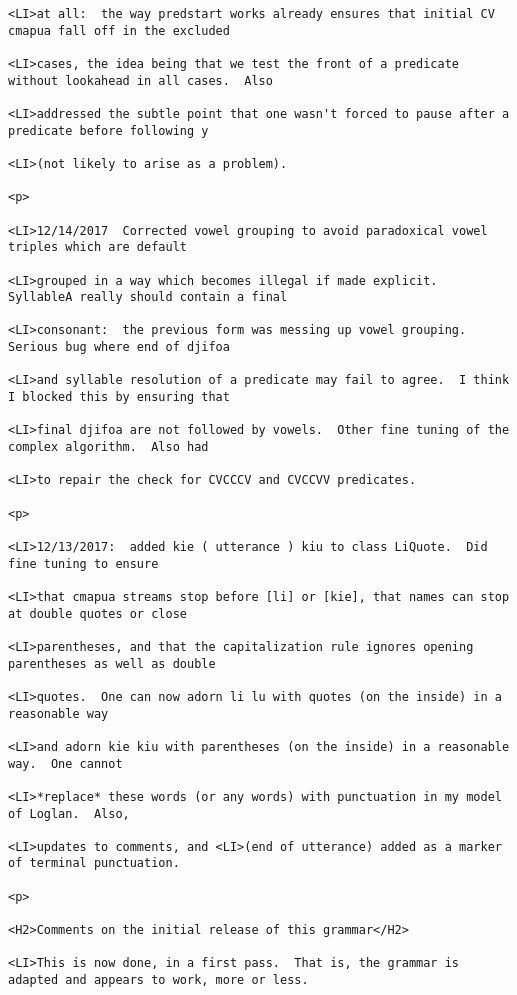 \documentclass[12pt]{article}
\begin{document}
\begin{lstlisting}
<LI>at all:  the way predstart works already ensures that initial CV cmapua fall off in the excluded

<LI>cases, the idea being that we test the front of a predicate without lookahead in all cases.  Also

<LI>addressed the subtle point that one wasn't forced to pause after a predicate before following y

<LI>(not likely to arise as a problem).

<p>

<LI>12/14/2017  Corrected vowel grouping to avoid paradoxical vowel triples which are default

<LI>grouped in a way which becomes illegal if made explicit.  SyllableA really should contain a final

<LI>consonant:  the previous form was messing up vowel grouping.  Serious bug where end of djifoa

<LI>and syllable resolution of a predicate may fail to agree.  I think I blocked this by ensuring that

<LI>final djifoa are not followed by vowels.  Other fine tuning of the complex algorithm.  Also had

<LI>to repair the check for CVCCCV and CVCCVV predicates.

<p>

<LI>12/13/2017:  added kie ( utterance ) kiu to class LiQuote.  Did fine tuning to ensure

<LI>that cmapua streams stop before [li] or [kie], that names can stop at double quotes or close

<LI>parentheses, and that the capitalization rule ignores opening parentheses as well as double

<LI>quotes.  One can now adorn li lu with quotes (on the inside) in a reasonable way

<LI>and adorn kie kiu with parentheses (on the inside) in a reasonable way.  One cannot

<LI>*replace* these words (or any words) with punctuation in my model of Loglan.  Also,

<LI>updates to comments, and <LI>(end of utterance) added as a marker of terminal punctuation.

<p>

<H2>Comments on the initial release of this grammar</H2>

<LI>This is now done, in a first pass.  That is, the grammar is adapted and appears to work, more or less.


\end{lstlisting}
\end{document}
